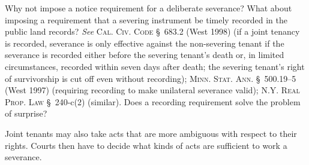 Why not impose a notice requirement for a deliberate severance? What about
imposing a requirement that a severing instrument be timely recorded in the
public land records? \emph{See} \textsc{Cal. Civ. Code} \S~683.2 (West 1998) (if
a joint tenancy is recorded, severance is only effective against the
non-severing tenant if the severance is recorded either before the severing
tenant's death or, in limited circumstances, recorded within seven days after
death; the severing tenant's right of survivorship is cut off even without
recording); \textsc{Minn. Stat. Ann.} \S~500.19--5 (West 1997) (requiring
recording to make unilateral severance valid); \textsc{N.Y. Real Prop. Law}
\S~240-c(2) (similar). Does a recording requirement solve the problem of
surprise?

Joint tenants may also take acts that are more ambiguous with respect to their
rights. Courts then have to decide what kinds of acts are sufficient to work a
severance.

